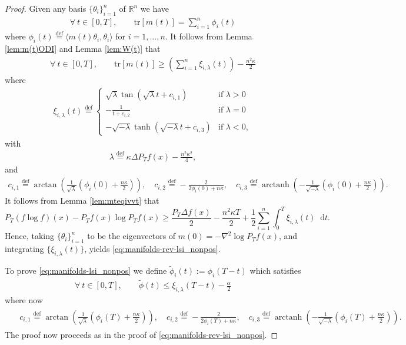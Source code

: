 \documentclass[a4paper,twoside,11pt,reqno]{amsart}
\newcommand{\eqdef}{\stackrel{\mathrm{def}}{=}}
\newcommand*\diff{\mathop{}\!\mathrm{d}}
\newcommand{\R}{\mathbb{R}} %
\DeclareMathOperator{\arctanh}{arctanh}
\newcommand{\mr}{\mathrm}
\begin{document}
\begin{proof}
Given any basis $\{\theta_i\}_{i=1}^n$ of $\R^n$ we have
\begin{align}
\label{eq:mphi}
\forall \ t\in [0,T],\qquad \mr{tr}[m(t)]=\sum_{i=1}^n\phi_i(t)
\end{align}
where $\phi_i(t)\eqdef\langle m(t)\theta_i,\theta_i\rangle$ for $i=1,\ldots, n$. It follows from Lemma \ref{lem:m(t)ODI} and Lemma \ref{lem:W(t)} that
\begin{align}
\label{eq:mphixi}
\forall \ t\in [0,T],\qquad \mr{tr}[m(t)]\ge \left(\sum_{i=1}^n\xi_{i,\lambda}(t)\right)-\frac{n^2\kappa}{2}
\end{align} 
where 
\begin{align}\label{eq:xi_proof}
\xi_{i,\lambda}(t)\eqdef
\begin{cases}
\sqrt{\lambda}\tan(\sqrt{\lambda}t+c_{i,1}) & \text{if }\lambda>0\\
-\frac{1}{t+c_{i,2}}& \text{if }\lambda=0\\
-\sqrt{-\lambda}\tanh(\sqrt{-\lambda}t+c_{i,3})
 & \text{if }\lambda<0,
\end{cases}
\end{align}
with 
\begin{align}\label{eq:lambda_proof}
\lambda\eqdef\kappa \Delta P_Tf(x)-\frac{n^2\kappa^2}{4}, 
\end{align}
and
\begin{align}\label{eq:c_proof}
c_{i,1}\eqdef\arctan\left(\frac{1}{\sqrt{\lambda}}\left(\phi_i(0)+\frac{n\kappa}{2}\right)\right),\quad c_{i,2}\eqdef-\frac{2}{2\phi_i(0)+n\kappa}, \quad c_{i,3}\eqdef\arctanh\left(-\frac{1}{\sqrt{-\lambda}}\left(\phi_i(0)+\frac{n\kappa}{2}\right)\right).
\end{align}
It follows from Lemma \ref{lem:mteqivvt} that
\begin{equation}
P_T(f\log f)(x)-P_Tf(x)\log P_Tf(x)\ge \frac{ P_T\Delta f(x)}{2}-\frac{n^2\kappa T}{2}+\frac{1}{2}\sum_{i=1}^n\int_0^T  \xi_{i,\lambda}(t)\diff t.
\end{equation}
Hence, taking $\{\theta_i\}_{i=1}^n$ to be the eigenvectors of $m(0)=-\nabla^2\log P_Tf(x)$, and integrating $\{\xi_{i,\lambda}(t)\}$, yields \eqref{eq:manifolds-rev-lsi_nonpos}.

To prove \eqref{eq:manifolds-lsi_nonpos} we define $\tilde\phi_i(t):=\phi_i(T-t)$ which satisfies 
\begin{align}
\forall \ t\in[0,T],\qquad \tilde\phi(t)\le \xi_{i,\lambda}(T-t)-\frac{\alpha}{2}
\end{align}
where now 
\begin{align}
\begin{split}\quad c_{i,1}\eqdef\arctan\left(\frac{1}{\sqrt{\lambda}}\left(\phi_i(T)+\frac{n\kappa}{2}\right)\right),\quad c_{i,2}\eqdef-\frac{2}{2\phi_i(T)+n\kappa}, \quad c_{i,3}\eqdef\arctanh\left(-\frac{1}{\sqrt{-\lambda}}\left(\phi_i(T)+\frac{n\kappa}{2}\right)\right).
\end{split}
\end{align}
The proof now proceeds as in the proof of \eqref{eq:manifolds-rev-lsi_nonpos}.
\end{proof}
\end{document}
